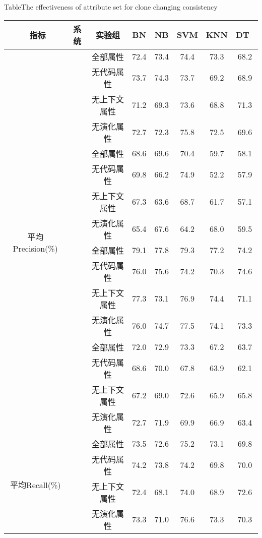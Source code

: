 \begin{table} [htbp]
\renewcommand\arraystretch{0.65} 
{Table$\!$}{The effectiveness of attribute set for clone changing consistency}
\vspace{0.5em}
\centering
\footnotesize
\begin{tabular}{cccccccc}
\toprule[1.5pt]
~{指标}&{系统}&{实验组}&{BN}&{NB}&{SVM}&{KNN}&{DT}~\\
\midrule[1pt]
\multirow{16}{*}{平均Precision(\%)}
&~\multirow{4}{*}{ArgoUML}
&全部属性& 72.4    & 73.4  & 74.4 & 73.3 & 68.2 \\
&&无代码属性 & 73.7    & 74.3  & 73.7 & 69.2 & 68.9 \\
&&无上下文属性  & 71.2    & 69.3  & 73.6 & 68.8 & 71.3 \\
&&无演化属性 & 72.7    & 72.3  & 75.8 & 72.5 & 69.6 \\
\cline{2-8}
&~\multirow{4}{*}{jEdit}
&全部属性& 68.6    & 69.6  & 70.4 & 59.7 & 58.1 \\
&&无代码属性 & 69.8    & 66.2  & 74.9 & 52.2 & 57.9 \\
&&无上下文属性  & 67.3    & 63.6  & 68.7 & 61.7 & 57.1 \\
&&无演化属性& 65.4    & 67.6  & 64.2 & 68.0  & 59.5 \\
\cline{2-8}
&~\multirow{4}{*}{jFreeChart}
&全部属性  & 79.1    & 77.8  & 79.3 & 77.2 & 74.2 \\
&&无代码属性 & 76.0     & 75.6  & 74.2 & 70.3 & 74.6 \\
&&无上下文属性  & 77.3    & 73.1  & 76.9 & 74.4 & 71.1 \\
&&无演化属性& 76.0     & 74.7  & 77.5 & 74.1 & 73.3 \\
\cline{2-8}
&~\multirow{4}{*}{Tuxguitar} 
&全部属性    & 72.0     & 72.9  & 73.3 & 67.2 & 63.7 \\
&&无代码属性 & 68.6    & 70.0    & 67.8 & 63.9 & 62.1 \\
&&无上下文属性  & 67.2    & 69.0   & 72.6 & 65.9 & 65.8 \\
&&无演化属性& 72.7    & 71.9  & 69.9 & 66.9 & 63.4 \\
\hline
\multirow{16}{*}{平均Recall(\%)}&
~\multirow{4}{*}{ArgoUML}
&全部属性   & 73.5    & 72.6  & 75.2 & 73.1 & 69.8 \\
&&无代码属性  & 74.2    & 73.8  & 74.2 & 69.8 & 70.0   \\
&&无上下文属性  & 72.4    & 68.1  & 74.0  & 68.9 & 72.6 \\
&&无演化属性& 73.3    & 71.0   & 76.6 & 73.3 & 70.3 \\

\end{tabular}
\end{table}

